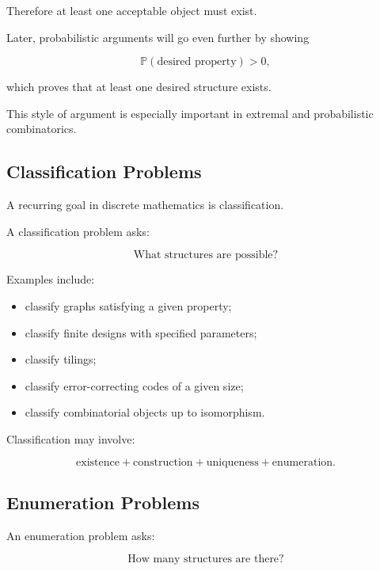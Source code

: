 Therefore at least one acceptable object must exist.

Later, probabilistic arguments will go even further by showing

\[
\mathbb{P}(\text{desired property})>0,
\]

which proves that at least one desired structure exists.

This style of argument is especially important in extremal and
probabilistic combinatorics.

\subsection{Classification Problems}
\label{subsec:classification-discrete}

A recurring goal in discrete mathematics is classification.

A classification problem asks:

\[
\boxed{
\text{What structures are possible?}
}
\]

Examples include:

\begin{itemize}
    \item classify graphs satisfying a given property;
    \item classify finite designs with specified parameters;
    \item classify tilings;
    \item classify error-correcting codes of a given size;
    \item classify combinatorial objects up to isomorphism.
\end{itemize}

Classification may involve:

\[
\text{existence}
+
\text{construction}
+
\text{uniqueness}
+
\text{enumeration}.
\]

\subsection{Enumeration Problems}
\label{subsec:enumeration-discrete}

An enumeration problem asks:

\[
\boxed{
\text{How many structures are there?}
}
\]

